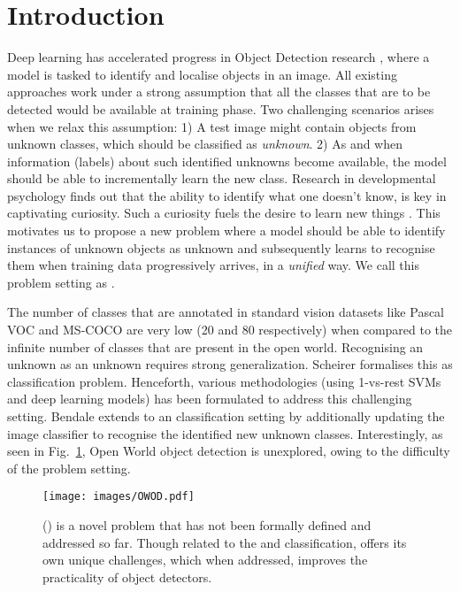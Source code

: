 \documentclass[final]{cvpr}
\begin{document}
\vspace{-1em}
\section{Introduction}\label{sec:introduction}
Deep learning has accelerated progress in Object Detection research \cite{girshick2015fast,ren2015faster,he2017mask,lin2017focal,redmon2016you}, where a model is tasked to identify and localise objects in an image. 
All existing approaches work under a strong assumption that all the classes that are to be detected would be available at training phase. Two challenging scenarios arises when we relax this assumption:
1) A test image might contain objects from unknown classes, which should be classified as \emph{unknown}. 
2) As and when information (labels) about such identified unknowns become available, the model should be able to incrementally learn the new class. 
Research in developmental psychology \cite{meacham1983wisdom,livio2017makes} finds out that the ability to identify what one doesn't know, is key in captivating curiosity. Such a curiosity fuels the desire to learn new things \cite{engel2011children,grazer2016curious}. 
This motivates us to propose a new problem where a model should be able to identify instances of unknown objects as unknown and subsequently learns to recognise them when training data progressively arrives, in a \textit{unified} way. We call this problem setting as \textit{\OWOD}.  

The number of classes that are annotated in standard vision datasets like Pascal VOC \cite{everingham2010pascal} and MS-COCO \cite{lin2014microsoft} are very low (20 and 80 respectively) when compared to the infinite number of classes that are present in the open world. Recognising an unknown as an unknown requires strong generalization. Scheirer \etal \cite{scheirer2012toward} formalises this as \textit{\OS} classification problem. Henceforth, various methodologies (using 1-vs-rest SVMs and deep learning models) has been formulated to address this challenging setting. 
Bendale \etal \cite{bendale2015towards} extends \OS to an \textit{\OW} classification setting by additionally updating the image classifier to recognise the identified new unknown classes. 
Interestingly, as seen in Fig.~\ref{fig:related_works}, Open World object detection is unexplored, owing to the difficulty of the problem setting.





\begin{figure}
\texttt{[image: images/OWOD.pdf]}
\caption{\OWOD ({\color{Orange}}) is a novel problem that has not been formally defined and addressed so far. Though related to the \OS and \OW classification, \OWOD offers its own unique challenges, which when addressed, improves the practicality of object detectors.}
\label{fig:related_works}
\end{figure}
\end{document}
